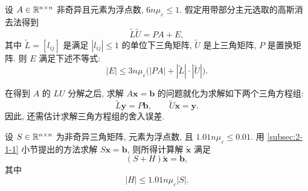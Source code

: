 \begin{corollary}
\label{cor:3-3}
设 $A\in\mathbb{R}^{n\times n}$ 非奇异且元素为浮点数, $6n\mu_\varepsilon\leqslant1$. 假定用带部分主元选取的高斯消去法得到
\[
  \widetilde{L}\widetilde{U}=PA+E,
\]
其中 $\widetilde{L}=[l_{ij}]$ 是满足 $|l_{ij}|\leqslant1$ 的单位下三角矩阵, $\widetilde{U}$ 是上三角矩阵, $P$ 是置换矩阵. 则 $E$ 满足下述不等式:
\[
  |E|\leqslant3n\mu_\varepsilon\bigl(|PA|+|\widetilde{L}|\cdot|\widetilde{U}|\bigr).
\]
\end{corollary}

在得到 $A$ 的 $LU$ 分解之后, 求解 $A\mathbf{x}=\mathbf{b}$ 的问题就化为求解如下两个三角方程组:
\[
  \widetilde{L}\mathbf{y}=P\mathbf{b},\qquad\widetilde{U}\mathbf{x}=\mathbf{y}.
\]
因此, 还需估计求解三角方程组的舍入误差.

\begin{lemma}
\label{lem:3-2}
设 $S\in\mathbb{R}^{n\times n}$ 为非奇异三角矩阵, 元素为浮点数, 且 $1.01n\mu_\varepsilon\leqslant0.01$. 用 \ref{subsec:2-1-1} 小节提出的方法求解 $S\mathbf{x}=\mathbf{b}$, 则所得计算解 $\tilde{\mathbf{x}}$ 满足
\[
  (S+H)\tilde{\mathbf{x}}=\mathbf{b},
\]
其中
\[
  |H|\leqslant1.01n\mu_\varepsilon|S|.
\]
\end{lemma}

